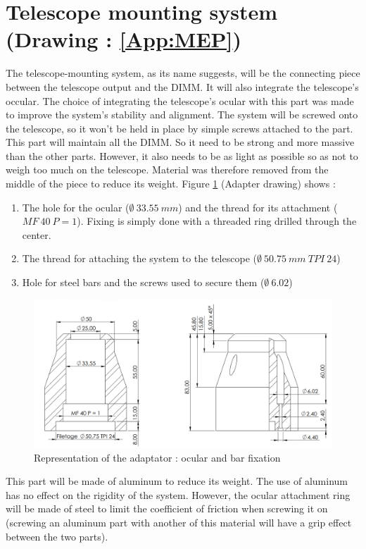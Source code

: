 \section{Telescope mounting system (Drawing : \ref{App:MEP})}\label{sec:adaptator}
The telescope-mounting system, as its name suggests, will be the connecting piece between the telescope output and the DIMM. It will 
also integrate the telescope's occular. The choice of integrating the telescope's ocular with this part was made to improve the system's 
stability and alignment. The system will be screwed onto the telescope, so it won't be held in place by simple screws attached to 
the part. \newline
This part will maintain all the DIMM. So it need to be strong and more massive than the other parts. However, it also needs to be as 
light as possible so as not to weigh too much on the telescope. Material was therefore removed from the middle of the piece to reduce 
its weight.
\bigbreak
Figure \ref{fig:Mec_Adapter1} (Adapter drawing) shows :
\begin{enumerate}
    \item The hole for the ocular ($\emptyset\ 33.55\ mm$) and the thread for its attachment ($MF\ 40\ P=1$). Fixing is simply done 
    with a threaded ring drilled through the center.
    \item The thread for attaching the system to the telescope ($\emptyset\ 50.75\ mm\ TPI\ 24$)
    \item Hole for steel bars and the screws used to secure them ($\emptyset\ 6.02$)
\end{enumerate}
\begin{figure}[H]
    \centering
    \includegraphics[scale=0.6]{assets/figures/Mechanical Design/Dessin_Part1_adapter.png}
    \caption{Representation of the adaptator : ocular and bar fixation}
    \label{fig:Mec_Adapter1}
\end{figure}
This part will be made of aluminum to reduce its weight. The use of aluminum has no effect on the rigidity of the system. \newline
However, the ocular attachment ring will be made of steel to limit the coefficient of friction when screwing it on 
(screwing an aluminum part with another of this material will have a grip effect between the two parts).
\newpage
